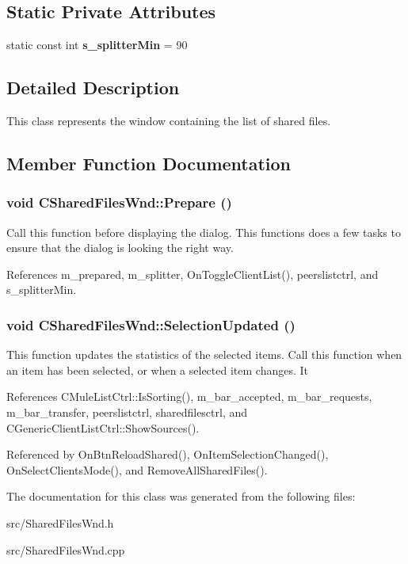 \subsection*{Static Private Attributes}
\begin{DoxyCompactItemize}
\item 
static const int {\bf s\_\-splitterMin} = 90\label{classCSharedFilesWnd_ad7e228a3ec40fb0f3f439c4ee26d28e5}

\end{DoxyCompactItemize}


\subsection{Detailed Description}
This class represents the window containing the list of shared files. 

\subsection{Member Function Documentation}
\subsubsection[{Prepare}]{\setlength{\rightskip}{0pt plus 5cm}void CSharedFilesWnd::Prepare ()}\label{classCSharedFilesWnd_af2c347e668babf9352c553b7a2f5d9e5}


Call this function before displaying the dialog. This functions does a few tasks to ensure that the dialog is looking the right way. 

References m\_\-prepared, m\_\-splitter, OnToggleClientList(), peerslistctrl, and s\_\-splitterMin.
\subsubsection[{SelectionUpdated}]{\setlength{\rightskip}{0pt plus 5cm}void CSharedFilesWnd::SelectionUpdated ()}\label{classCSharedFilesWnd_a616285120a7a02eb00ebec560ce51959}


This function updates the statistics of the selected items. Call this function when an item has been selected, or when a selected item changes. It 

References CMuleListCtrl::IsSorting(), m\_\-bar\_\-accepted, m\_\-bar\_\-requests, m\_\-bar\_\-transfer, peerslistctrl, sharedfilesctrl, and CGenericClientListCtrl::ShowSources().

Referenced by OnBtnReloadShared(), OnItemSelectionChanged(), OnSelectClientsMode(), and RemoveAllSharedFiles().

The documentation for this class was generated from the following files:\begin{DoxyCompactItemize}
\item 
src/SharedFilesWnd.h\item 
src/SharedFilesWnd.cpp\end{DoxyCompactItemize}
